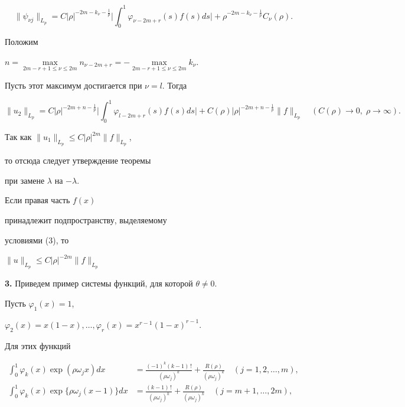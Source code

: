 \begin{pf}
$$ 


\|\psi_{\nu j}\|_{L_p}=C|\rho|^{-2m-k_\nu-\frac{1}{p}} 


\biggl|\int^1_0\varphi_{\nu-2m+r}(s)f(s)ds\biggr| 


+\rho^{-2m-k_\nu-\frac{1}{p}}C_\nu(\rho). 


$$ 


Положим 


$n=\max\limits_{2m-r+1\le\nu\le 2m}n_{\nu-2m+r} 


=-\max\limits_{2m-r+1\le\nu\le 2m}k_\nu$. 


Пусть этот максимум достигается при $\nu=l$. Тогда 


$$ 


\|u_2\|_{L_p}=C|\rho|^{-2m+n-\frac{1}{p}} 


\biggl|\int^1_0\varphi_{l-2m+r}(s)f(s)ds\biggr| 


+C(\rho)|\rho|^{-2m+n-\frac{1}{p}}\|f\|_{L_p}\quad 


(C(\rho)\to 0,\;\rho\to \infty). 


$$ 


Так как $\|u_1\|_{L_p}\le C|\rho|^{2m}\|f\|_{L_p}$, 


то отсюда следует утверждение теоремы 


при замене $\lambda$ на $-\lambda$. 


\end{pf} 


 


\begin{cornonum} Если правая часть $f(x)$ 


принадлежит подпространству, выделяемому 


условиями (3), то 


$\|u\|_{L_p}\le C|\rho|^{-2m}\|f\|_{L_p}$ 


\end{cornonum} 


 


{\bf 3.} Приведем пример системы функций, для которой $\theta\ne 0$. 


Пусть $\varphi_1(x)=1$, 


$\varphi_2(x)=x(1-x),\dotsc,\varphi_r(x)=x^{r-1}(1-x)^{r-1}$. 


Для этих функций 


\begin{align*} 


\int^1_0\varphi_k(x)\exp(\rho\omega_jx)dx 


&=\frac{(-1)^k(k-1)\,!}{(\rho\omega_j)^k} 


+\frac{R(\rho)}{(\rho\omega_j)^k}\quad (j=1,2,\dotsc,m),\\ 


\int^1_0\varphi_k(x)\exp\{\rho\omega_j(x-1)\}dx 


&=\frac{(k-1)\,!}{(\rho\omega_j)^k} 


+\frac{R(\rho)}{(\rho\omega_j)^k}\quad (j=m+1,\dotsc,2m),


\end{align*} 


